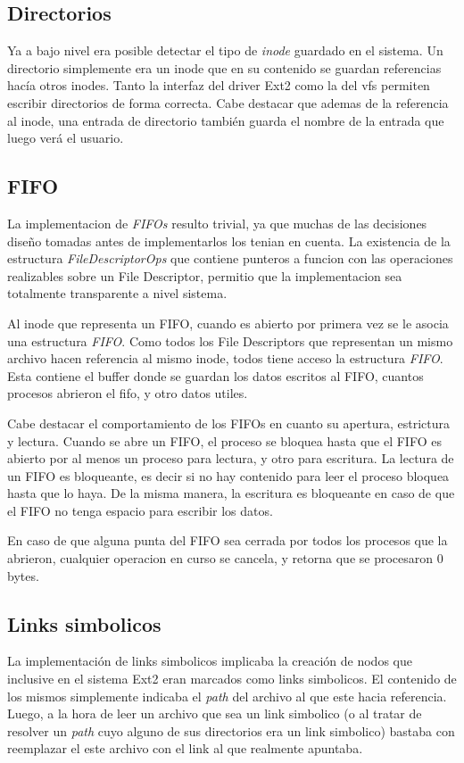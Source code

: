 \documentclass[a4paper,10pt]{article}
\begin{document}
\subsection{Directorios}

Ya a bajo nivel era posible detectar el tipo de \textit{inode} guardado en el sistema. Un directorio simplemente era
un inode que en su contenido se guardan referencias hacía otros inodes. Tanto la interfaz del driver Ext2 como la del
vfs permiten escribir directorios de forma correcta. Cabe destacar que ademas de la referencia al inode, una entrada
de directorio también guarda el nombre de la entrada que luego verá el usuario.

\subsection{FIFO}
La implementacion de \textit{FIFOs} resulto trivial, ya que muchas de las decisiones diseño tomadas antes de implementarlos los tenian en cuenta.
La existencia de la estructura \textit{FileDescriptorOps} que contiene punteros a funcion con las operaciones realizables sobre un File Descriptor, permitio que la implementacion sea totalmente transparente a nivel sistema.

Al inode que representa un FIFO, cuando es abierto por primera vez se le asocia una estructura \textit{FIFO}.
Como todos los File Descriptors que representan un mismo archivo hacen referencia al mismo inode, todos tiene acceso la estructura \textit{FIFO}.
Esta contiene el buffer donde se guardan los datos escritos al FIFO, cuantos procesos abrieron el fifo, y otro datos utiles.

Cabe destacar el comportamiento de los FIFOs en cuanto su apertura, estrictura y lectura.
Cuando se abre un FIFO, el proceso se bloquea hasta que el FIFO es abierto por al menos un proceso para lectura, y otro para escritura.
La lectura de un FIFO es bloqueante, es decir si no hay contenido para leer el proceso bloquea hasta que lo haya.
De la misma manera, la escritura es bloqueante en caso de que el FIFO no tenga espacio para escribir los datos.

En caso de que alguna punta del FIFO sea cerrada por todos los procesos que la abrieron, cualquier operacion en curso se cancela, y retorna que se procesaron 0 bytes.

\subsection{Links simbolicos}
La implementación de links simbolicos implicaba la creación de nodos que inclusive en el sistema Ext2 eran marcados
como links simbolicos. El contenido de los mismos simplemente indicaba el \textit{path} del archivo al que este
hacia referencia.
Luego, a la hora de leer un archivo que sea un link simbolico (o al tratar de resolver un \textit{path} cuyo alguno
de sus directorios era un link simbolico) bastaba con reemplazar el este archivo con el link al que realmente
apuntaba.
\end{document}
